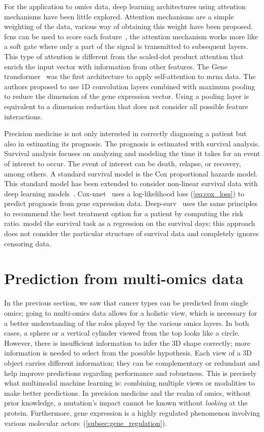 \documentclass[../main.tex]{subfiles}
\begin{document}
	For the application to omics data, deep learning architectures using attention mechanisms have been little explored.
	Attention mechanisms are a simple weighting of the data, various way of obtaining this weight have been proposed.
	\Glspl{fcn} can be used to score each feature~\cite{Lee2022,beykikhoshkDeepTRIAGEInterpretableIndividualised2020a}, the attention mechanism works more like a soft gate where only a part of the signal is transmitted to subsequent layers.
	This type of attention is different from the scaled-dot product attention that enrich the input vector with information from other features.
	The Gene transformer~\cite{Khan2023} was the first architecture to apply self-attention to \gls{mrna} data.
	The authors proposed to use 1D convolution layers combined with maximum pooling to reduce the dimension of the gene expression vector.
	Using a pooling layer is equivalent to a dimension reduction that does not consider all possible feature interactions.

	Precision medicine is not only interested in correctly diagnosing a patient but also in estimating its prognosis.
	The prognosis is estimated with survival analysis.
	Survival analysis focuses on analyzing and modeling the time it takes for an event of interest to occur.
	The event of interest can be death, relapse, or recovery, among others.
	A standard survival model is the Cox proportional hazards model.
	This standard model has been extended to consider non-linear survival data with deep learning models~\cite{katzmanDeepSurvPersonalizedTreatment2018,Ching2018}.
	Cox-nnet~\cite{Ching2018} uses a log-likelihood loss (\cref{eq:cox_loss}) to predict prognosis from gene expression data.
	Deep-surv~\cite{katzmanDeepSurvPersonalizedTreatment2018} uses the same principles to recommend the best treatment option for a patient by computing the risk ratio.
	\citeauthor{Lee2022} model the survival task as a regression on the survival days; this approach does not consider the particular structure of survival data and completely ignores censoring data.

\section{Prediction from multi-omics data}
	In the previous section, we saw that cancer types can be predicted from single omics; going to multi-omics data allows for a holistic view, which is necessary for a better understanding of the roles played by the various omics layers.
	In both cases, a sphere or a vertical cylinder viewed from the top looks like a circle.
	However, there is insufficient information to infer the 3D shape correctly; more information is needed to select from the possible hypothesis.
	Each view of a 3D object carries different information; they can be complementary or redundant and help improve predictions regarding performance and robustness.
	This is precisely what multimodal machine learning is: combining multiple views or modalities to make better predictions.
	In precision medicine and the realm of omics, without prior knowledge, a mutation's impact cannot be known without \textit{looking} at the protein.
	Furthermore, gene expression is a highly regulated phenomenon involving various molecular actors~(\cref{subsec:gene_regulation}).
\end{document}
